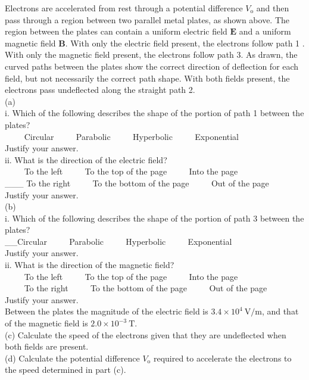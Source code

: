 \begin{enumerate}
Electrons are accelerated from rest through a potential difference $V_{\mathrm{o}}$ and then pass through a region between two parallel metal plates, as shown above. The region between the plates can contain a uniform electric field $\mathbf{E}$ and a uniform magnetic field $\mathbf{B}$. With only the electric field present, the electrons follow path 1 . With only the magnetic field present, the electrons follow path 3. As drawn, the curved paths between the plates show the correct direction of deflection for each field, but not necessarily the correct path shape. With both fields present, the electrons pass undeflected along the straight path 2.\\
(a)\\
i. Which of the following describes the shape of the portion of path 1 between the plates?\\
$\qquad$ Circular $\qquad$ Parabolic $\qquad$ Hyperbolic $\qquad$ Exponential\\
Justify your answer.\\
ii. What is the direction of the electric field?\\
$\qquad$ To the left $\qquad$ To the top of the page $\qquad$ Into the page\\
\_\_\_ To the right $\qquad$ To the bottom of the page $\qquad$ Out of the page\\
Justify your answer.\\
(b)\\
i. Which of the following describes the shape of the portion of path 3 between the plates?\\
\_\_Circular $\qquad$ Parabolic $\qquad$ Hyperbolic $\qquad$ Exponential\\
Justify your answer.\\
ii. What is the direction of the magnetic field?\\
$\qquad$ To the left $\qquad$ To the top of the page $\qquad$ Into the page\\
$\qquad$ To the right $\qquad$ To the bottom of the page $\qquad$ Out of the page\\
Justify your answer.\\
Between the plates the magnitude of the electric field is $3.4 \times 10^{4} \mathrm{~V} / \mathrm{m}$, and that of the magnetic field is $2.0 \times 10^{-3} \mathrm{~T}$.\\
(c) Calculate the speed of the electrons given that they are undeflected when both fields are present.\\
(d) Calculate the potential difference $V_{\mathrm{o}}$ required to accelerate the electrons to the speed determined in part (c).


\end{enumerate}
